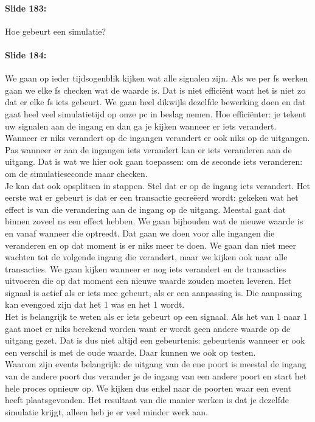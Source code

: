\documentclass[10pt,a4paper]{book}
\begin{document}
\paragraph{Slide 183:} Hoe gebeurt een simulatie?

\paragraph{Slide 184:} We gaan op ieder tijdsogenblik kijken wat alle signalen zijn. Als we per fs werken gaan we elke fs checken wat de waarde is. Dat is niet effici\"ent want het is niet zo dat er elke fs iets gebeurt. We gaan heel dikwijls dezelfde bewerking doen en dat gaat heel veel simulatietijd op onze pc in beslag nemen. Hoe effici\"enter: je tekent uw signalen aan de ingang en dan ga je kijken wanneer er iets verandert. Wanneer er niks verandert op de ingangen verandert er ook niks op de uitgangen. Pas wanneer er aan de ingangen iets verandert kan er iets veranderen aan de uitgang. Dat is wat we hier ook gaan toepassen: om de seconde iets veranderen: om de simulatieseconde maar checken.\\
Je kan dat ook opsplitsen in stappen. Stel dat er op de ingang iets verandert. Het eerste wat er gebeurt is dat er een transactie gecre\"eerd wordt: gekeken wat het effect is van die verandering aan de ingang op de uitgang. Meestal gaat dat binnen zoveel ns een effect hebben. We gaan bijhouden wat de nieuwe waarde is en vanaf wanneer die optreedt. Dat gaan we doen voor alle ingangen die veranderen en op dat moment is er niks meer te doen. We gaan dan niet meer wachten tot de volgende ingang die verandert, maar we kijken ook naar alle transacties. We gaan kijken wanneer er nog iets verandert en de transacties uitvoeren die op dat moment een nieuwe waarde zouden moeten leveren. Het signaal is actief als er iets mee gebeurt, als er een aanpassing is. Die aanpassing kan evengoed zijn dat het 1 was en het 1 wordt.\\
Het is belangrijk te weten als er iets gebeurt op een signaal. Als het van 1 naar 1 gaat moet er niks berekend worden want er wordt geen andere waarde op de uitgang gezet. Dat is dus niet altijd een gebeurtenis: gebeurtenis wanneer er ook een verschil is met de oude waarde. Daar kunnen we ook op testen.\\
Waarom zijn events belangrijk: de uitgang van de ene poort is meestal de ingang van de andere poort dus verander je de ingang van een andere poort en start het hele proces opnieuw op. We kijken dus enkel naar de poorten waar een event heeft plaatsgevonden. Het resultaat van die manier werken is dat je dezelfde simulatie krijgt, alleen heb je er veel minder werk aan.
\end{document}
